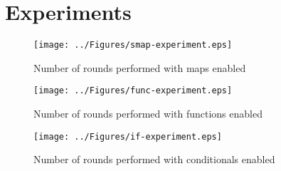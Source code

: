 \chapter{Experiments}

\label{ChapterExperiments}

\begin{figure}
    \texttt{[image: ../Figures/smap-experiment.eps]}
    \caption{Number of rounds performed with maps enabled}
\end{figure}

\begin{figure}
    \texttt{[image: ../Figures/func-experiment.eps]}
    \caption{Number of rounds performed with functions enabled}
\end{figure}

\begin{figure}
    \texttt{[image: ../Figures/if-experiment.eps]}
    \caption{Number of rounds performed with conditionals enabled}
\end{figure}
